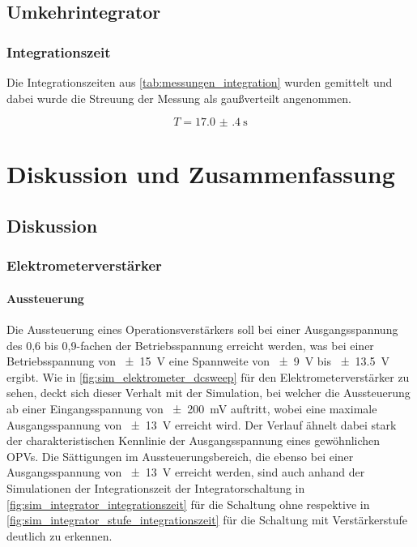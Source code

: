 \documentclass[12pt,english,ngerman]{scrartcl}
\begin{document}
\subsection{Umkehrintegrator}

\subsubsection{Integrationszeit}
Die Integrationszeiten aus \autoref{tab:messungen_integration} wurden gemittelt
und dabei wurde die Streuung der Messung als gaußverteilt angenommen.

\begin{equation}
  T = \SI{17.0(4)}{\second}
  \label{eq:wert_integrationszeit}
\end{equation}

\section{Diskussion und Zusammenfassung}\label{sec:Diskussion} 
\subsection{Diskussion}

\subsubsection{Elektrometerverstärker}
\paragraph{Aussteuerung}
Die Aussteuerung eines Operationsverstärkers soll bei einer Ausgangsspannung
des 0,6 bis 0,9-fachen der Betriebsspannung erreicht werden, was bei einer
Betriebsspannung von \SI{\pm 15}{\volt} eine Spannweite von \SI{\pm 9}{\volt}
bis \SI{\pm 13,5}{\volt} ergibt. Wie in \autoref{fig:sim_elektrometer_dcsweep}
für den Elektrometerverstärker zu sehen, deckt sich dieser Verhalt mit der
Simulation, bei welcher die Aussteuerung ab einer Eingangsspannung von 
\SI{\pm 200}{\milli\volt} auftritt, wobei eine maximale Ausgangsspannung von
\SI{\pm 13}{\volt} erreicht wird. Der Verlauf ähnelt dabei stark der
charakteristischen Kennlinie der Ausgangsspannung eines gewöhnlichen OPVs. Die
Sättigungen im Aussteuerungsbereich, die ebenso bei einer Ausgangsspannung von
\SI{\pm 13}{\volt} erreicht werden, sind auch anhand der Simulationen der
Integrationszeit der Integratorschaltung in
\autoref{fig:sim_integrator_integrationszeit} für die Schaltung ohne respektive
in \autoref{fig:sim_integrator_stufe_integrationszeit} für die Schaltung mit
Verstärkerstufe deutlich zu erkennen. 
\end{document}
